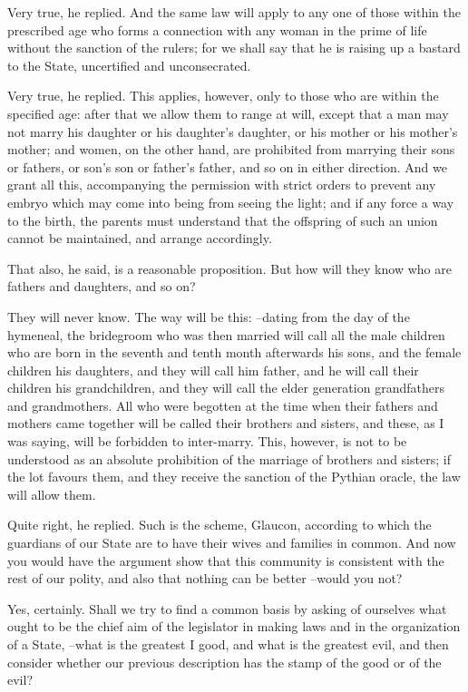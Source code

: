 Very true, he replied.
And the same law will apply to any one of those within the prescribed age who forms a connection with any woman in the prime of life without the sanction of the rulers; for we shall say that he is raising up a bastard to the State, uncertified and unconsecrated.

Very true, he replied.
This applies, however, only to those who are within the specified age: after that we allow them to range at will, except that a man may not marry his daughter or his daughter's daughter, or his mother or his mother's mother; and women, on the other hand, are prohibited from marrying their sons or fathers, or son's son or father's father, and so on in either direction. And we grant all this, accompanying the permission with strict orders to prevent any embryo which may come into being from seeing the light; and if any force a way to the birth, the parents must understand that the offspring of such an union cannot be maintained, and arrange accordingly.

That also, he said, is a reasonable proposition. But how will they know who are fathers and daughters, and so on?

They will never know. The way will be this: --dating from the day of the hymeneal, the bridegroom who was then married will call all the male children who are born in the seventh and tenth month afterwards his sons, and the female children his daughters, and they will call him father, and he will call their children his grandchildren, and they will call the elder generation grandfathers and grandmothers. All who were begotten at the time when their fathers and mothers came together will be called their brothers and sisters, and these, as I was saying, will be forbidden to inter-marry. This, however, is not to be understood as an absolute prohibition of the marriage of brothers and sisters; if the lot favours them, and they receive the sanction of the Pythian oracle, the law will allow them.

Quite right, he replied.
Such is the scheme, Glaucon, according to which the guardians of our State are to have their wives and families in common. And now you would have the argument show that this community is consistent with the rest of our polity, and also that nothing can be better --would you not?

Yes, certainly.
Shall we try to find a common basis by asking of ourselves what ought to be the chief aim of the legislator in making laws and in the organization of a State, --what is the greatest I good, and what is the greatest evil, and then consider whether our previous description has the stamp of the good or of the evil?

